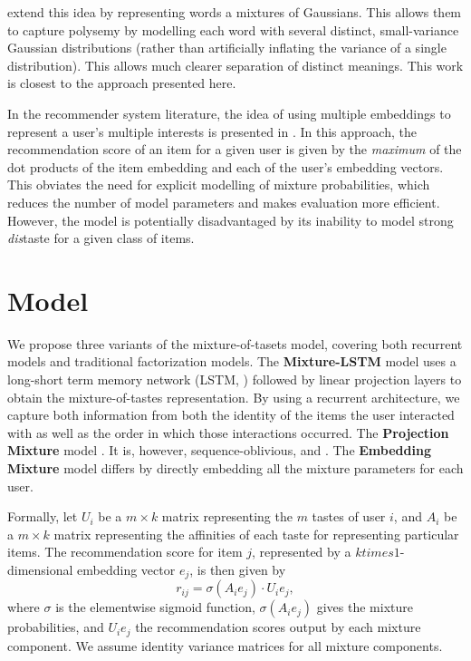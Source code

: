 \documentclass[sigconf]{acmart}
\begin{document}
\citet{athiwaratkun2017multimodal} extend this idea by representing words a mixtures of Gaussians. This allows them to capture polysemy by modelling each word with several distinct, small-variance Gaussian distributions (rather than artificially inflating the variance of a single distribution). This allows much clearer separation of distinct meanings. This work is closest to the approach presented here.

In the recommender system literature, the idea of using multiple embeddings to represent a user's multiple interests is presented in \citet{weston2013nonlinear}. In this approach, the recommendation score of an item for a given user is given by the \emph{maximum} of the dot products of the item embedding and each of the user's embedding vectors. This obviates the need for explicit modelling of mixture probabilities, which reduces the number of model parameters and makes evaluation more efficient. However, the model is potentially disadvantaged by its inability to model strong \emph{dis}taste for a given class of items.

\section{Model}
We propose three variants of the mixture-of-tasets model, covering both recurrent models and traditional factorization models. The \textbf{Mixture-LSTM} model uses a long-short term memory network (LSTM, \cite{hochreiter1997long}) followed by linear projection layers to obtain the mixture-of-tastes representation. By using a recurrent architecture, we capture both information from both the identity of the items the user interacted with as well as the order in which those interactions occurred. The \textbf{Projection Mixture} model . It is, however, sequence-oblivious, and . The \textbf{Embedding Mixture} model differs by directly embedding all the mixture parameters for each user.

Formally, let $U_i$ be a $m \times k$ matrix representing the $m$ tastes of user $i$, and $A_i$ be a $m \times k$ matrix representing the affinities of each taste for representing particular items. The recommendation score for item $j$, represented by a $k times 1$-dimensional embedding vector $e_j$, is then given by
\begin{equation}
  r_{ij} = \sigma\left(A_ie_j\right) \cdot U_ie_j,
\end{equation}
where $\sigma$ is the elementwise sigmoid function, $\sigma\left(A_ie_j\right)$ gives the mixture probabilities, and $U_ie_j$ the recommendation scores output by each mixture component. We assume identity variance matrices for all mixture components.
\end{document}
